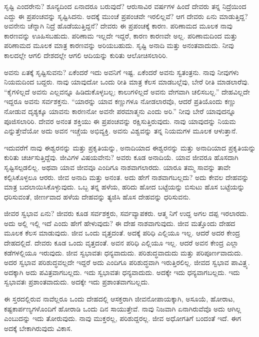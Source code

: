 ಸೃಷ್ಟಿ ಎಂದರೇನು? ಶೂನ್ಯದಿಂದ ಏನಾದರೂ ಬರುವುದೆ? ಆರುಸಾವಿರ ವರ್ಷಗಳ ಹಿಂದೆ ದೇವರು ತನ್ನ ನಿದ್ರೆಯಿಂದ ಎದ್ದು ಈ ಪ್ರಪಂಚವನ್ನು ಸೃಷ್ಟಿಸಿದನು. ಅದಕ್ಕೆ ಮುಂಚೆ ಪ್ರಪಂಚವೇ ಇರಲಿಲ್ಲವೆ? ಆಗ ದೇವರು ಏನು ಮಾಡುತ್ತಿದ್ದ? ಅವನೇನು ಚೆನ್ನಾಗಿ ನಿದ್ರೆ ಹೊಡೆಯುತ್ತಿದ್ದನೆ? ದೇವರು ಈ ಪ್ರಪಂಚಕ್ಕೆ ಕಾರಣ. ಪರಿಣಾಮದ ಮೂಲಕ ನಾವು ಕಾರಣವನ್ನು ಊಹಿಸಬಹುದು. ಪರಿಣಾಮ ಇಲ್ಲದೇ ಇದ್ದರೆ, ಕಾರಣ ಕಾರಣವೇ ಅಲ್ಲ. ಪರಿಣಾಮದಿಂದ ಮತ್ತು ಪರಿಣಾಮದ ಮೂಲಕ ಮಾತ್ರ ಕಾರಣವನ್ನು ಅರಿಯಬಹುದು. ಸೃಷ್ಟಿ ಅನಾದಿ ಮತ್ತು ಅನಂತವಾದುದು. ನೀವು ಕಾಲದಲ್ಲೇ ಆಗಲಿ ದೇಶದಲ್ಲೇ ಆಗಲಿ ಆದಿಯನ್ನು ಕುರಿತು ಆಲೋಚಿಸಲಾರಿರಿ.

ಅವನು ಏತಕ್ಕೆ ಸೃಷ್ಟಿಸುವನು? ಏಕೆಂದರೆ ಇದು ಅವನಿಗೆ ಇಷ್ಟ. ಏಕೆಂದರೆ ಅವನು ಸ್ವತಂತ್ರನು. ನಾವು ನೀವುಗಳು ನಿಯಮದಿಂದ ಬದ್ದರು. ನಾವು ಯಾವುದೋ ಒಂದು ರೀತಿ ಮಾತ್ರ ಕೆಲಸ ಮಾಡಬಲ್ಲೆವು, ಬೇರೆ ರೀತಿ ಮಾಡಲಾರೆವು. “ಕೈಗಳಿಲ್ಲದೆ ಅವನು ಎಲ್ಲವನ್ನೂ ಹಿಡಿದುಕೊಳ್ಳಬಲ್ಲ; ಕಾಲುಗಳಿಲ್ಲದೆ ಅವನು ವೇಗವಾಗಿ ಚಲಿಸಬಲ್ಲ.'' ದೇಹವಿಲ್ಲದೇ ಇದ್ದರೂ ಅವನು ಸರ್ವಶಕ್ತನು. “ಯಾರನ್ನು ಯಾವ ಕಣ್ಣುಗಳೂ ನೋಡಲಾರವೊ, ಆದರೆ ಪ್ರತಿಯೊಂದು ಕಣ್ಣು ನೋಡುವ ದೃಶ್ಯಕ್ಕೂ ಯಾವನು ಕಾರಣನೋ ಅವನೇ ಪರಮಾತ್ಮನು ಎಂದು ಅರಿ.” ನೀವು ಬೇರೆ ಯಾವುದನ್ನೂ ಪೂಜಿಸಲಾರಿರಿ. ದೇವರ ಅನಂತ ಶಕ್ತಿಯು ಈ ಪ್ರಪಂಚವನ್ನು ರಕ್ಷಿಸುತ್ತಿರುವುದು. ನಾವು ಯಾವುದನ್ನು ನಿಯಮ ಎನ್ನುತ್ತೇವೆಯೋ ಅದು ಅವನ ಇಚ್ಚೆಯ ಅಭಿವ್ಯಕ್ತಿ. ಅವನು ವಿಶ್ವವನ್ನು ತನ್ನ ನಿಯಮಗಳ ಮೂಲಕ ಆಳುತ್ತಾನೆ.

ಇದುವರೆಗೆ ನಾವು ಈಶ್ವರನನ್ನು ಮತ್ತು ಪ್ರಕೃತಿಯನ್ನು, ಅನಾದಿಯಾದ ಈಶ್ವರನನ್ನು ಮತ್ತು ಅನಾದಿಯಾದ ಪ್ರಕೃತಿಯನ್ನು ಕುರಿತು ಚರ್ಚಿಸುತ್ತಿದ್ದೆವು. ಜೀವಿಗಳ ವಿಷಯವೇನು? ಅವರು ಕೂಡ ಅನಾದಿಯೆ. ಯಾವ ಜೀವರೂ ಹೊಸದಾಗಿ ಸೃಷ್ಟಿಸಲ್ಪಡಲಿಲ್ಲ. ಅಥವಾ ಯಾವ ಜೀವವೂ ಎಂದಿಗೂ ನಾಶವಾಗಲಾರದು. ಯಾರೂ ತಮ್ಮ ಸಾವನ್ನು ತಾವೇ ಕಲ್ಪಿಸಿಕೊಳ್ಳಲೂ ಆರರು. ಜೀವ ಅನಾದಿ ಮತ್ತು ಅನಂತ. ಅದು ಹೇಗೆ ನಾಶವಾಗಬಲ್ಲದು? ಅದು ಕೇವಲ ದೇಹವನ್ನು ಮಾತ್ರ ಬದಲಾಯಿಸಿಕೊಳ್ಳುವುದು. ಒಬ್ಬ ತನ್ನ ಹಳೆಯ, ಹರಿದು ಹೋದ ಬಟ್ಟೆಯನ್ನು ಬಿಸುಟು ಹೊಸ ಬಟ್ಟೆಯನ್ನು ಧರಿಸುವಂತೆ, ಜೀರ್ಣವಾದ ಹಳೆಯ ದೇಹವನ್ನು ತ್ಯಜಿಸಿ ಹೊಸ ದೇಹವನ್ನು ಧರಿಸುವನು.

ಜೀವರ ಸ್ವಭಾವ ಏನು? ಜೀವರು ಕೂಡ ಸರ್ವಶಕ್ತರು, ಸರ್ವವ್ಯಾಪಕರು. ಆತ್ಮ ನಿಗೆ ಉದ್ದ ಅಗಲ ದಪ್ಪ ಇರಲಾರದು. ಅದು ಅಲ್ಲಿ ಇಲ್ಲಿ ಇದೆ ಎಂದು ಹೇಗೆ ಹೇಳುವುದು? ಈ ದೇಹ ನಾಶವಾಗುವುದು. ಜೀವ ಮತ್ತೊಂದು ದೇಹದ ಮೂಲಕ ಕೆಲಸ ಮಾಡುವುದು. ಜೀವ ಒಂದು ವೃತ್ತದಂತೆ. ಅದಕ್ಕೆ ಪರಿಧಿ ಎಲ್ಲಿಯೂ ಇಲ್ಲ. ಆದರೆ ಅದರ ಕೇಂದ್ರ ದೇಹದಲ್ಲಿದೆ. ದೇವರು ಕೂಡ ಒಂದು ವೃತ್ತದಂತೆ. ಅವನ ಪರಿಧಿ ಎಲ್ಲಿಯೂ ಇಲ್ಲ. ಆದರೆ ಅವನ ಕೇಂದ್ರ ಎಲ್ಲಾ ಕಡೆಗಳಲ್ಲಿಯೂ ಇರುವುದು. ಜೀವ ಸ್ವಭಾವತಃ ಧನ್ಯವಾದುದು. ಪರಿಶುದ್ಧವಾದುದು ಮತ್ತು ಪರಿಪೂರ್ಣವಾದುದು. ಅದರ ಸ್ವಭಾವ ಪರಿಶುದ್ಧವಲ್ಲದೇ ಇದ್ದರೆ ಅದು ಎಂದಿಗೂ ಪರಿಶುದ್ಧವಾಗಿ ಇರುತ್ತಿರಲಿಲ್ಲ. ಜೀವದ ಸ್ವಭಾವ ಪಾವಿತ್ರ್ಯ. ಅದಕ್ಕಾಗಿ ಅದು ಪವಿತ್ರವಾಗಬಲ್ಲದು. ಇದು ಸ್ವಭಾವತಃ ಧನ್ಯವಾದುದು. ಅದಕ್ಕೇ ಇದು ಧನ್ಯವಾಗಬಲ್ಲದು. ಇದು ಸ್ವಭಾವತಃ ಪ್ರಶಾಂತವಾದುದು. ಅದಕ್ಕೇ ಇದು ಪ್ರಶಾಂತವಾಗಬಲ್ಲದು.

ಈ ಸ್ತರದಲ್ಲಿರುವ ನಾವೆಲ್ಲರೂ ಒಂದು ದೇಹದಲ್ಲಿ ಆಸಕ್ತರಾಗಿ ಜೀವನೋಪಾಯಕ್ಕಾಗಿ, ಅಸೂಯೆ, ಹೋರಾಟ, ಕಷ್ಟಕಾರ್ಪಣ್ಯಗಳೊಂದಿಗೆ ಹೋರಾಡಿ ಒಂದು ದಿನ ಸಾಯುತ್ತೇವೆ. ನಾವು ನಿಜವಾಗಿ ಏನಾಗಿರುವೆವೊ ಅದು ಆಗಿಲ್ಲ ಎಂಬುದನ್ನು ಇದು ತೋರುವುದು. ನಾವು ಮುಕ್ತರಲ್ಲ, ಪರಿಶುದ್ದರಲ್ಲ. ಜೀವ ಅಧೋಗತಿಗೆ ಬಂದಂತೆ ಇದೆ. ಈಗ ಅದಕ್ಕೆ ಬೇಕಾಗಿರುವುದು ವಿಕಾಸ.

